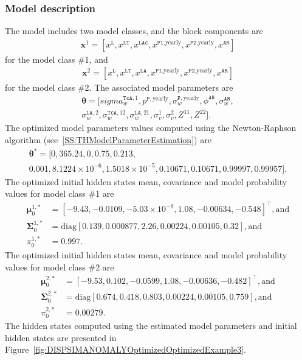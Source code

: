 \subsubsection{Model description}
\label{SS:ModelConstructionExample3}
The model includes two model classes, and the block components are 
\begin{gather*}
\mathbf{x}^{1}=[x^{\mathtt{L}}, x^{\mathtt{LT}}, x^{\mathtt{LAc}}, x^{\mathtt{P1}\text{,yearly}} , x^{\mathtt{P2}\text{,yearly}}, x^{\mathtt{AR}}]
 \end{gather*}
for the model class \#1, and
\begin{gather*}
\mathbf{x}^{2}=[x^{\mathtt{L}}, x^{\mathtt{LT}}, x^{\mathtt{LA}}, x^{\mathtt{P1}\text{,yearly}} , x^{\mathtt{P2}\text{,yearly}}, x^{\mathtt{AR}}]
 \end{gather*}
for the model class \#2.
The associated model parameters are
\begin{gather*}
\bm\theta=[sigma_{w}^{\mathtt{TcA},1}, p^{\mathtt{P}, \text{yearly}}, \sigma_{w}^{\mathtt{P}, \text{yearly}}, \phi^{\mathtt{AR}}, \sigma_{w}^{\mathtt{AR}}, \\
 \sigma_{w}^{\mathtt{LA},2}, \sigma_{w}^{\mathtt{TcA}, 12}, \sigma_{w}^{\mathtt{LA}, 21}, \sigma^{1}_{v}, \sigma^{2}_{v}, Z^{11},   Z^{22}] \text{.}
 \end{gather*}
The optimized model parameters values computed using the Newton-Raphson algorithm (see~\ref{SS:THModelParameterEstimation}) are
\begin{gather*}
\bm\theta^{\text{*}}=[0, 365.24, 0, 0.75, 0.213, \\
0.001, 8.1224\times10^{-6}, 1.5018\times10^{-5}, 0.10671, 0.10671, 0.99997, 0.99957].
\end{gather*}
The optimized initial hidden states mean, covariance  and model probability values for model class \#1 are 
\begin{align*}
 \bm \mu^{1,\text{*}}_{0} & = [	-9.43 ,	-0.0109	, -5.03\times 10^{-9}	, 1.08  ,	-0.00634	, -0.548    ]^{\intercal}, \text{and} \\
\bm\Sigma^{1,\text{*}}_{0}  & = \text{diag}[	0.139 ,	0.000877,	2.26  	,0.00224	,0.00105,	0.32     ],  \text{and} \\
 \pi_{0}^{1,\text{*}} & = 0.997.
\end{align*}
The optimized initial hidden states mean, covariance  and model probability values for model class \#2 are 
\begin{align*}
 \bm \mu^{2,\text{*}}_{0} & = [	-9.53 ,	0.102 ,	-0.0599	,  1.08  ,	-0.00636, 	-0.482     ]^{\intercal}, \text{and} \\
 \bm\Sigma^{2,\text{*}}_{0}  & = \text{diag}[	0.674 	,0.418 ,	0.803 ,	0.00224,	0.00105	, 0.759    ], \text{and} \\
 \pi_{0}^{2,\text{*}} & = 0.00279.
\end{align*}
The hidden states computed using the estimated model parameters and initial hidden states are presented in Figure~\ref{fig:DISPSIMANOMALYOptimizedOptimizedExample3}.

